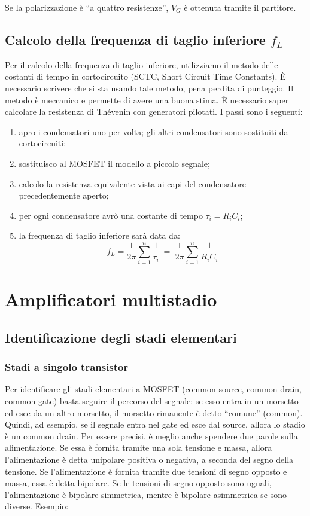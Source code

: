 \documentclass[a4paper,twocolumn,notitlepage]{book}
\begin{document}
	Se la polarizzazione è ``a quattro resistenze'', $V_G$ è ottenuta tramite il partitore.
	
	\subsection*{Calcolo della frequenza di taglio inferiore $f_L$}
	Per il calcolo della frequenza di taglio inferiore, utilizziamo il metodo delle costanti di tempo in cortocircuito (SCTC, Short Circuit Time Constants). È necessario scrivere che si sta usando tale metodo, pena perdita di punteggio.\newline
	Il metodo è meccanico e permette di avere una buona stima. È necessario saper calcolare la resistenza di Thévenin con generatori pilotati. I passi sono i seguenti:
	\begin{enumerate}
		\item apro i condensatori uno per volta; gli altri condensatori sono sostituiti da cortocircuiti;
		\item sostituisco al MOSFET il modello a piccolo segnale;
		\item calcolo la resistenza equivalente vista ai capi del condensatore precedentemente aperto;
		\item per ogni condensatore avrò una costante di tempo $\tau_i=R_i C_i$;
		\item la frequenza di taglio inferiore sarà data da:
			\begin{equation}
				f_L=\frac{1}{2 \pi} \sum_{i=1}^n \frac{1}{\tau_i} \:=\: \frac{1}{2 \pi} \sum_{i=1}^n \frac{1}{R_i C_i}
			\end{equation}
	\end{enumerate}
	
	\section*{Amplificatori multistadio}
	\subsection*{Identificazione degli stadi elementari}
		\subsubsection*{Stadi a singolo transistor}	
		Per identificare gli stadi elementari a MOSFET (common source, common drain, common gate) basta seguire il percorso del segnale: se esso entra in un morsetto ed esce da un altro morsetto, il morsetto rimanente è detto  ``comune''  (common).
		Quindi, ad esempio, se il segnale entra nel gate ed esce dal source, allora lo stadio è un common drain.
	Per essere precisi, è meglio anche spendere due parole sulla alimentazione. 
Se essa è fornita tramite una sola tensione e massa, allora l'alimentazione è detta unipolare positiva o negativa, a seconda del segno della tensione.  \newline
		Se l'alimentazione è fornita tramite due tensioni di segno opposto e massa, essa è detta bipolare. Se le tensioni di segno opposto sono uguali, l'alimentazione è bipolare simmetrica, mentre è bipolare asimmetrica se sono diverse.
		\newline
		Esempio: \medskip
		
\end{document}
